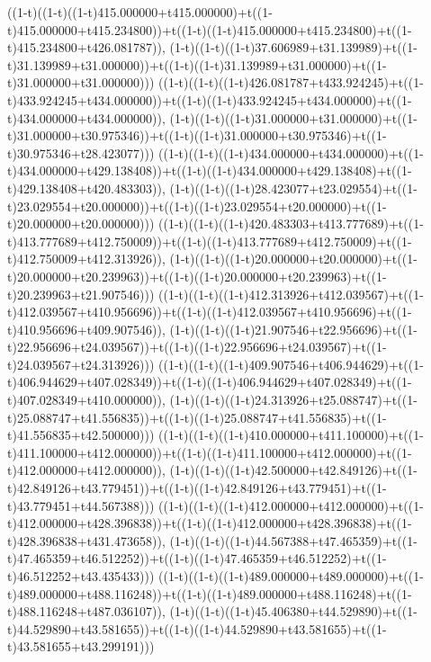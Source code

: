 ((1-t)((1-t)((1-t)415.000000+t415.000000)+t((1-t)415.000000+t415.234800))+t((1-t)((1-t)415.000000+t415.234800)+t((1-t)415.234800+t426.081787)),                                     (1-t)((1-t)((1-t)37.606989+t31.139989)+t((1-t)31.139989+t31.000000))+t((1-t)((1-t)31.139989+t31.000000)+t((1-t)31.000000+t31.000000)))
((1-t)((1-t)((1-t)426.081787+t433.924245)+t((1-t)433.924245+t434.000000))+t((1-t)((1-t)433.924245+t434.000000)+t((1-t)434.000000+t434.000000)),                                     (1-t)((1-t)((1-t)31.000000+t31.000000)+t((1-t)31.000000+t30.975346))+t((1-t)((1-t)31.000000+t30.975346)+t((1-t)30.975346+t28.423077)))
((1-t)((1-t)((1-t)434.000000+t434.000000)+t((1-t)434.000000+t429.138408))+t((1-t)((1-t)434.000000+t429.138408)+t((1-t)429.138408+t420.483303)),                                     (1-t)((1-t)((1-t)28.423077+t23.029554)+t((1-t)23.029554+t20.000000))+t((1-t)((1-t)23.029554+t20.000000)+t((1-t)20.000000+t20.000000)))
((1-t)((1-t)((1-t)420.483303+t413.777689)+t((1-t)413.777689+t412.750009))+t((1-t)((1-t)413.777689+t412.750009)+t((1-t)412.750009+t412.313926)),                                     (1-t)((1-t)((1-t)20.000000+t20.000000)+t((1-t)20.000000+t20.239963))+t((1-t)((1-t)20.000000+t20.239963)+t((1-t)20.239963+t21.907546)))
((1-t)((1-t)((1-t)412.313926+t412.039567)+t((1-t)412.039567+t410.956696))+t((1-t)((1-t)412.039567+t410.956696)+t((1-t)410.956696+t409.907546)),                                     (1-t)((1-t)((1-t)21.907546+t22.956696)+t((1-t)22.956696+t24.039567))+t((1-t)((1-t)22.956696+t24.039567)+t((1-t)24.039567+t24.313926)))
((1-t)((1-t)((1-t)409.907546+t406.944629)+t((1-t)406.944629+t407.028349))+t((1-t)((1-t)406.944629+t407.028349)+t((1-t)407.028349+t410.000000)),                                     (1-t)((1-t)((1-t)24.313926+t25.088747)+t((1-t)25.088747+t41.556835))+t((1-t)((1-t)25.088747+t41.556835)+t((1-t)41.556835+t42.500000)))
((1-t)((1-t)((1-t)410.000000+t411.100000)+t((1-t)411.100000+t412.000000))+t((1-t)((1-t)411.100000+t412.000000)+t((1-t)412.000000+t412.000000)),                                     (1-t)((1-t)((1-t)42.500000+t42.849126)+t((1-t)42.849126+t43.779451))+t((1-t)((1-t)42.849126+t43.779451)+t((1-t)43.779451+t44.567388)))
((1-t)((1-t)((1-t)412.000000+t412.000000)+t((1-t)412.000000+t428.396838))+t((1-t)((1-t)412.000000+t428.396838)+t((1-t)428.396838+t431.473658)),                                     (1-t)((1-t)((1-t)44.567388+t47.465359)+t((1-t)47.465359+t46.512252))+t((1-t)((1-t)47.465359+t46.512252)+t((1-t)46.512252+t43.435433)))
((1-t)((1-t)((1-t)489.000000+t489.000000)+t((1-t)489.000000+t488.116248))+t((1-t)((1-t)489.000000+t488.116248)+t((1-t)488.116248+t487.036107)),                                     (1-t)((1-t)((1-t)45.406380+t44.529890)+t((1-t)44.529890+t43.581655))+t((1-t)((1-t)44.529890+t43.581655)+t((1-t)43.581655+t43.299191)))
